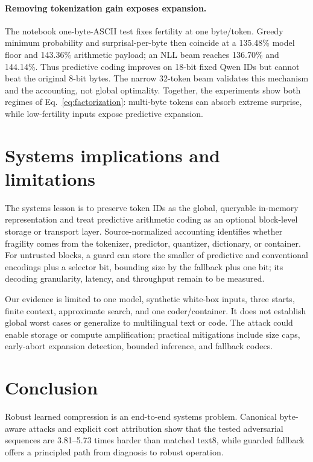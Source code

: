 \documentclass{article}
\begin{document}
\paragraph{Removing tokenization gain exposes expansion.}
The notebook one-byte-ASCII test fixes fertility at one byte/token. Greedy minimum
probability and surprisal-per-byte then coincide at a 135.48\% model floor and
143.36\% arithmetic payload; an NLL beam reaches 136.70\% and 144.14\%.
Thus predictive coding improves on 18-bit fixed Qwen IDs but cannot beat the
original 8-bit bytes. The narrow 32-token beam validates this mechanism and the
accounting, not global optimality. Together, the experiments show both regimes of
Eq.~\ref{eq:factorization}: multi-byte tokens can absorb extreme surprise, while
low-fertility inputs expose predictive expansion.

\section{Systems implications and limitations}
\label{sec:limitations}

The systems lesson is to preserve token IDs as the global, queryable in-memory
representation and treat predictive arithmetic coding as an optional block-level
storage or transport layer. Source-normalized accounting identifies whether
fragility comes from the tokenizer, predictor, quantizer, dictionary, or
container. For untrusted blocks, a guard can store the smaller of predictive and
conventional encodings plus a selector bit, bounding size by the fallback plus one
bit; its decoding granularity, latency, and throughput remain to be measured.

Our evidence is limited to one model, synthetic white-box inputs, three starts,
finite context, approximate search, and one coder/container. It does not establish
global worst cases or generalize to multilingual text or code. The attack could
enable storage or compute amplification; practical mitigations include size caps,
early-abort expansion detection, bounded inference, and fallback codecs.

\section{Conclusion}

Robust learned compression is an end-to-end systems problem. Canonical byte-aware attacks and explicit cost attribution show that the tested
adversarial sequences are 3.81--5.73 times harder than matched text8, while
guarded fallback offers a principled path from diagnosis to robust operation.
\end{document}

